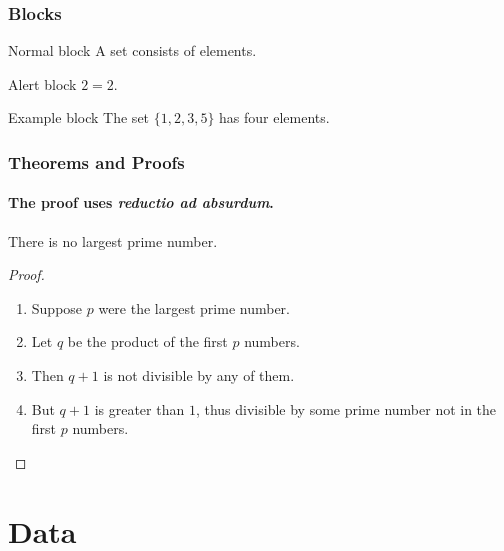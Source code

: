 \documentclass[UTF8, aspectratio=169 , 10pt，punct=kaiming]{beamer} %
\begin{document}
\begin{frame}
  \frametitle{Blocks}

  \begin{block}{Normal block}
A \alert{set} consists of elements.
\end{block}

\begin{alertblock}{Alert block}
$2=2$.
\end{alertblock}

\begin{exampleblock}{Example block}
The set $\{1,2,3,5\}$ has four elements.
\end{exampleblock}

\end{frame}

\begin{frame}
  \frametitle{Theorems and Proofs}
  \framesubtitle{The proof uses \textit{reductio ad absurdum}.}
  
  \begin{theorem}
    There is no largest prime number.
  \end{theorem}

  \begin{proof}
    \begin{enumerate}
      \item<1-| alert@1> Suppose $p$ were the largest prime number.
      \item<2-> Let $q$ be the product of the first $p$ numbers.
      \item<3-> Then $q+1$ is not divisible by any of them.
      \item<1-> But $q + 1$ is greater than $1$, thus divisible by some prime
      number not in the first $p$ numbers.\qedhere
    \end{enumerate}
  \end{proof}
  \end{frame}



\section{Data}
\end{document}
